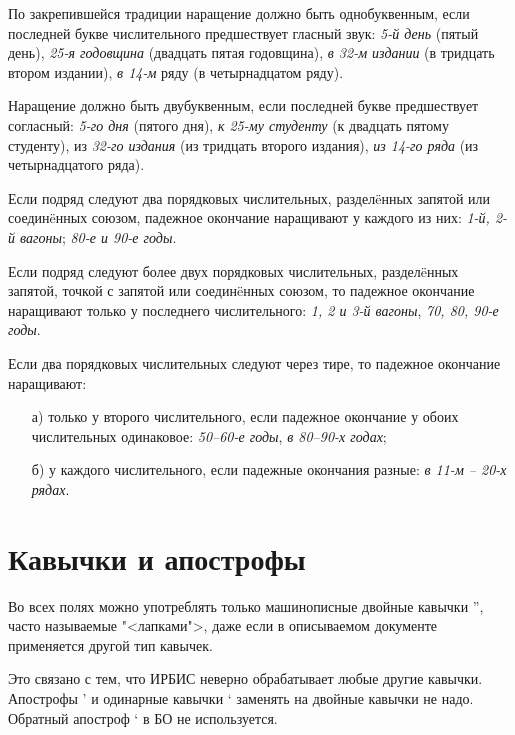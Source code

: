 По закрепившейся традиции наращение должно быть однобуквенным, если последней букве числительного предшествует гласный звук: \emph{5-й день} (пятый день), \emph{25-я годовщина} (двадцать пятая годовщина), \emph{в 32-м издании} (в тридцать втором издании), \emph{в 14-м} ряду (в четырнадцатом ряду).

Наращение должно быть двубуквенным, если последней букве предшествует согласный: \emph{5-го дня} (пятого дня), \emph{к 25-му студенту} (к двадцать пятому студенту), из \emph{32-го издания} (из тридцать второго издания), \emph{из 14-го ряда} (из четырнадцатого ряда).

Если подряд следуют два порядковых числительных, раздел\"eнных запятой или соедин\"eнных союзом, падежное окончание наращивают у каждого из них: \emph{1-й, 2-й вагоны}; \emph{80-е и 90-е годы}.

Если подряд следуют более двух порядковых числительных, раздел\"eнных запятой, точкой с запятой или соедин\"eнных союзом, то падежное окончание наращивают только у последнего числительного: \emph{1, 2 и 3-й вагоны}, \emph{70, 80, 90-е годы}.

Если два порядковых числительных следуют через тире, то падежное окончание наращивают:

\begin{itemize}
    \item[а)] только у второго числительного, если падежное окончание у обоих числительных одинаковое: \emph{50–60-е годы}, \emph{в 80–90-х годах};
    \item [б)] у каждого числительного, если падежные окончания разные: \emph{в 11-м – 20-х рядах}.
\end{itemize}


\section{Кавычки и апострофы}

Во всех полях можно употреблять только машинописные двойные кавычки '', часто называемые "<лапками">, даже если в описываемом документе применяется другой тип кавычек.

Это связано с тем, что ИРБИС неверно обрабатывает любые другие кавычки. Апострофы ' и одинарные кавычки ‘ заменять на двойные кавычки не надо. Обратный апостроф ` в БО не используется.

